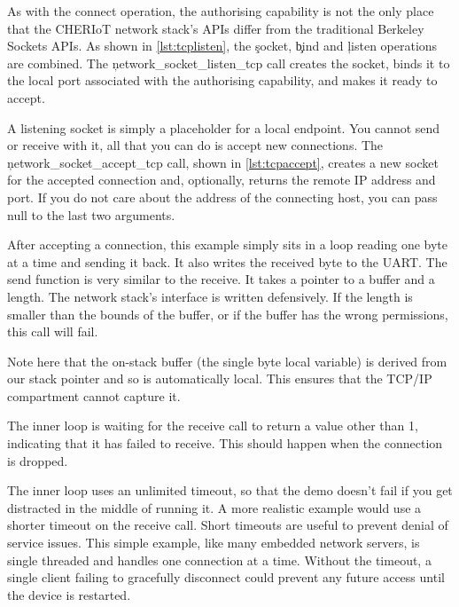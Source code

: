 \codelisting[filename=examples/tcp_echo_server/tcp.cc,marker=server_capability,label=lst:tcplistencap,caption="A static capability that authorises binding to a local port."]{}

As with the connect operation, the authorising capability is not the only place that the CHERIoT network stack's APIs differ from the traditional Berkeley Sockets APIs.
As shown in \ref{lst:tcplisten}, the \c{socket}, \c{bind} and \c{listen} operations are combined.
The \c{network_socket_listen_tcp} call creates the socket, binds it to the local port associated with the authorising capability, and makes it ready to accept.

\codelisting[filename=examples/tcp_echo_server/tcp.cc,marker=listen,label=lst:tcplisten,caption="Listening for TCP connections to a local port."]{}

A listening socket is simply a placeholder for a local endpoint.
You cannot send or receive with it, all that you can do is accept new connections.
The \c{network_socket_accept_tcp} call, shown in \ref{lst:tcpaccept}, creates a new socket for the accepted connection and, optionally, returns the remote IP address and port.
If you do not care about the address of the connecting host, you can pass null to the last two arguments.

\codelisting[filename=examples/tcp_echo_server/tcp.cc,marker=accept,label=lst:tcpaccept,caption="Accepting TCP connections and running a simple echo-server loop."]{}

After accepting a connection, this example simply sits in a loop reading one byte at a time and sending it back.
It also writes the received byte to the UART.
The send function is very similar to the receive.
It takes a pointer to a buffer and a length.
The network stack's interface is written defensively.
If the length is smaller than the bounds of the buffer, or if the buffer has the wrong permissions, this call will fail.


Note here that the on-stack buffer (the single byte local variable) is derived from our stack pointer and so is automatically local.
This ensures that the TCP/IP compartment cannot capture it.

The inner loop is waiting for the receive call to return a value other than 1, indicating that it has failed to receive.
This should happen when the connection is dropped.

The inner loop uses an unlimited timeout, so that the demo doesn't fail if you get distracted in the middle of running it.
A more realistic example would use a shorter timeout on the receive call.
Short timeouts are useful to prevent denial of service issues.
This simple example, like many embedded network servers, is single threaded and handles one connection at a time.
Without the timeout, a single client failing to gracefully disconnect could prevent any future access until the device is restarted.

